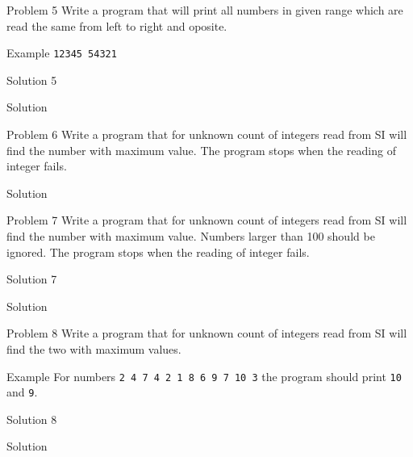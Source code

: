 \begin{frame}[fragile]{Problem 5}
Write a program that will print all numbers in given range which are read the
same from left to right and oposite.
\begin{exampleblock}{Example}
\texttt{12345    54321}
\end{exampleblock}
\end{frame}

\begin{frame}[fragile]{Solution 5}
\begin{exampleblock}{Solution}

\end{exampleblock}
\end{frame}


\begin{frame}[fragile]{Problem 6}
\scriptsize{
Write a program that for unknown count of integers read from SI will find the
number with maximum value. The program stops when the reading of integer fails.}
\pause
\begin{exampleblock}{Solution}

\end{exampleblock}
\end{frame}


\begin{frame}[fragile]{Problem 7}
Write a program that for unknown count of integers read from SI will find the
number with maximum value. Numbers larger than 100 should be ignored. The
program stops when the reading of integer fails.
\end{frame}

\begin{frame}[fragile]{Solution 7}
\begin{exampleblock}{Solution}

\end{exampleblock}
\end{frame}

\begin{frame}{Problem 8}
Write a program that for unknown count of integers read from SI will find the
two with maximum values. 
\begin{exampleblock}{Example}
For numbers \texttt{2 4 7 4 2 1 8 6 9 7 10 3} the program should print
\texttt{10} and \texttt{9}.
\end{exampleblock}
\end{frame}

\begin{frame}[fragile]{Solution 8}
\begin{exampleblock}{Solution}

\end{exampleblock}
\end{frame}


